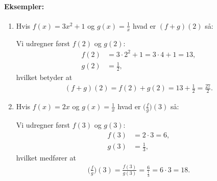 \paragraph*{Eksempler:}
\begin{enumerate}
\item Hvis $f(x)=3x^2+1$ og $g(x)=\frac{1}{x}$ hvad er $(f+g)(2)$ så:

Vi udregner først $f(2)$ og $g(2)$:
\begin{align*}
f(2) &= 3 \cdot 2^2 + 1 = 3 \cdot 4 + 1 = 13, \\
g(2) &= \frac{1}{2},
\end{align*}
hvilket betyder at
\begin{align*}
(f+g)(2)=f(2)+g(2) = 13 + \frac{1}{2} = \frac{27}{2}.
\end{align*}
\item Hvis $f(x)=2x$ og $g(x)=\frac{1}{x}$ hvad er $\big(\frac{f}{g}\big)(3)$ så:

Vi udregner først $f(3)$ og $g(3)$:
\begin{align*}
f(3) &= 2 \cdot 3 = 6,\\
g(3) &= \frac{1}{3},
\end{align*}
hvilket medfører at 
\begin{align*}
\Big( \frac{f}{g}\Big) (3) = \frac{f(3)}{g(3)} = \frac{6}{\frac{1}{3}} = 6 \cdot 3 = 18.
\end{align*}
\end{enumerate}